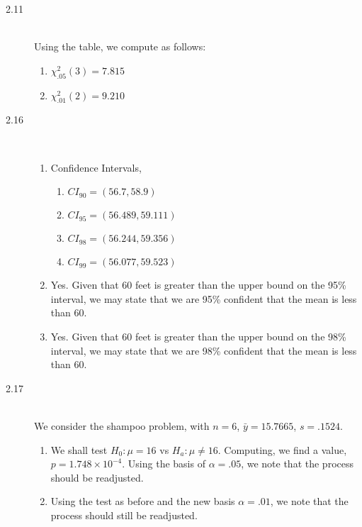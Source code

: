 \documentclass[letterpaper,10pt]{article}
\begin{document}
\begin{description}
\item[2.11]\hfill \\
Using the table, we compute as follows:
\begin{enumerate}[label=\alph*.]
\item $\chi^2_{.05}(3)=7.815$
\item $\chi^2_{.01}(2)=9.210$
\end{enumerate}

\item[2.16]\hfill \\
\begin{enumerate}[label=\alph*.]
\item Confidence Intervals,
\begin{enumerate}
\item $CI_{90}=(56.7,58.9)$
\item $CI_{95}=(56.489,59.111)$
\item $CI_{98}=(56.244,59.356)$
\item $CI_{99}=(56.077,59.523)$
\end{enumerate}
\item Yes. Given that 60 feet is greater than the upper bound on the 95\% interval, we may state that we are 95\% confident that the mean is less than 60.
\item Yes. Given that 60 feet is greater than the upper bound on the 98\% interval, we may state that we are 98\% confident that the mean is less than 60.
\end{enumerate}

\item[2.17]\hfill \\
We consider the shampoo problem, with $n=6$, $\bar{y}=15.7665$, $s=.1524$.
\begin{enumerate}[label=\alph*.]
\item We shall test $H_0: \mu=16$ vs $H_a:\mu\neq 16$. Computing, we find a value, $p=1.748\times 10^{-4}$. Using the basis of $\alpha=.05$, we note that the process should be readjusted.
\item Using the test as before and the new basis $\alpha=.01$, we note that the process should still be readjusted.
\end{enumerate}
\end{description}
\end{document}
